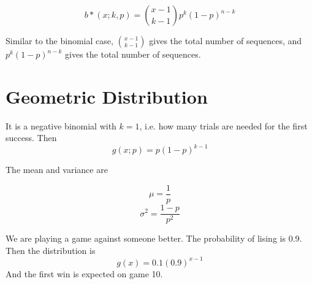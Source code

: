 \documentclass[12pt]{article}
\begin{document}
$$b*(x;k,p) = \binom{x-1}{k-1}p^k(1-p)^{n-k}$$

Similar to the binomial case, $\binom{x-1}{k-1}$ gives the total number of sequences, and $p^k(1-p)^{n-k}$ gives the total number of sequences. \\

\section{Geometric Distribution}

It is a negative binomial with $k=1$, i.e. how many trials are needed for the first success. Then
$$g(x;p) = p(1-p)^{k-1}$$

The mean and variance are

$$\mu = \frac{1}{p}$$
$$\sigma^2 = \frac{1-p}{p^2}$$

\begin{ex}
	We are playing a game against someone better. The probability of lising is 0.9. Then the distribution is
	$$g(x) = 0.1(0.9)^{x-1}$$
	And the first win is expected on game 10.
\end{ex}
\end{document}
